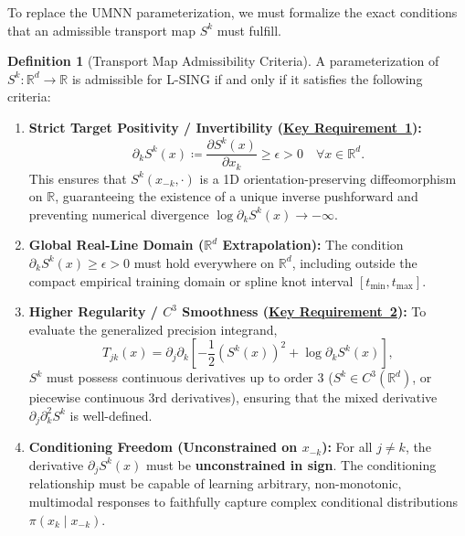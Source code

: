 \documentclass[11pt,a4paper]{article}
\theoremstyle{plain}
\theoremstyle{definition}
\newtheorem{definition}[theorem]{Definition}
\theoremstyle{remark}
\begin{document}
To replace the UMNN parameterization, we must formalize the exact conditions that an admissible transport map $S^k$ must fulfill.

\begin{definition}[Transport Map Admissibility Criteria]
\label{def:admissibility_criteria}
A parameterization of $S^k: \mathbb{R}^d \to \mathbb{R}$ is admissible for L-SING if and only if it satisfies the following criteria:
\begin{enumerate}
    \item {}\label{crit:target_monotonicity}\textbf{Strict Target Positivity / Invertibility (\hyperref[req:key_requirement_1]{Key Requirement~1}):}
    \begin{equation}
        \partial_k S^k(x) \coloneqq \frac{\partial S^k(x)}{\partial x_k} \ge \epsilon > 0 \quad \forall x \in \mathbb{R}^d.
    \end{equation}
    This ensures that $S^k(x_{-k}, \cdot)$ is a 1D orientation-preserving diffeomorphism on $\mathbb{R}$, guaranteeing the existence of a unique inverse pushforward and preventing numerical divergence $\log \partial_k S^k(x) \to -\infty$.
    
    \item {}\label{crit:global_domain}\textbf{Global Real-Line Domain ($\mathbb{R}^d$ Extrapolation):}
    The condition $\partial_k S^k(x) \ge \epsilon > 0$ must hold everywhere on $\mathbb{R}^d$, including outside the compact empirical training domain or spline knot interval $[t_{\min}, t_{\max}]$.
    
    \item {}\label{crit:c3_smoothness}\textbf{Higher Regularity / $C^3$ Smoothness (\hyperref[req:key_requirement_2]{Key Requirement~2}):}
    To evaluate the generalized precision integrand,
    \begin{equation}
        T_{jk}(x) = \partial_j \partial_k \left[ -\frac{1}{2}(S^k(x))^2 + \log \partial_k S^k(x) \right],
    \end{equation}
    $S^k$ must possess continuous derivatives up to order 3 ($S^k \in C^3(\mathbb{R}^d)$, or piecewise continuous 3rd derivatives), ensuring that the mixed derivative $\partial_j \partial_k^2 S^k$ is well-defined.
    
    \item {}\label{crit:conditioning_freedom}\textbf{Conditioning Freedom (Unconstrained on $x_{-k}$):}
    For all $j \neq k$, the derivative $\partial_j S^k(x)$ must be \textbf{unconstrained in sign}. The conditioning relationship must be capable of learning arbitrary, non-monotonic, multimodal responses to faithfully capture complex conditional distributions $\pi(x_k \mid x_{-k})$.
\end{enumerate}
\end{definition}
\end{document}
